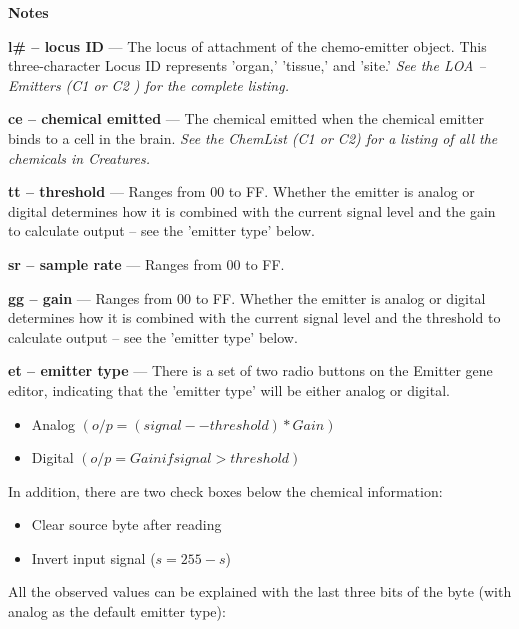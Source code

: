 \documentclass[11pt,twoside,a4paper]{article}
\begin{document}
\textbf{\large Notes}


\textbf{l\# -- locus ID} --- The locus of attachment of the chemo-emitter object. This three-character Locus ID represents 'organ,' 'tissue,' and 'site.' 
\emph{See the LOA -- Emitters (C1 or C2 ) for the complete listing.}

\textbf{ce -- chemical emitted} --- The chemical emitted when the chemical emitter binds to a cell in the brain. 
\emph{See the ChemList (C1 or C2) for a listing of all the chemicals in Creatures. }

\textbf{tt -- threshold} --- Ranges from 00 to FF. Whether the emitter is analog or digital determines how it is combined with the current signal level and the gain to calculate output -- see the 'emitter type' below.

\textbf{sr -- sample rate} --- Ranges from 00 to FF.

\textbf{gg -- gain} --- Ranges from 00 to FF. Whether the emitter is analog or digital determines how it is combined with the current signal level and the threshold to calculate output -- see the 'emitter type' below.

\textbf{et -- emitter type} --- There is a set of two radio buttons on the Emitter gene editor, indicating that the 'emitter type' will be either analog or digital.
\begin{itemize}
	\item Analog $(o/p = (signal -- threshold) * Gain)$
	\item Digital $(o/p = Gain if signal > threshold)$
\end{itemize}

In addition, there are two check boxes below the chemical information:
\begin{itemize}
	\item Clear source byte after reading
	\item Invert input signal ($s=255-s$)
\end{itemize}

All the observed values can be explained with the last three bits of the byte (with analog as the default emitter type):
\end{document}
